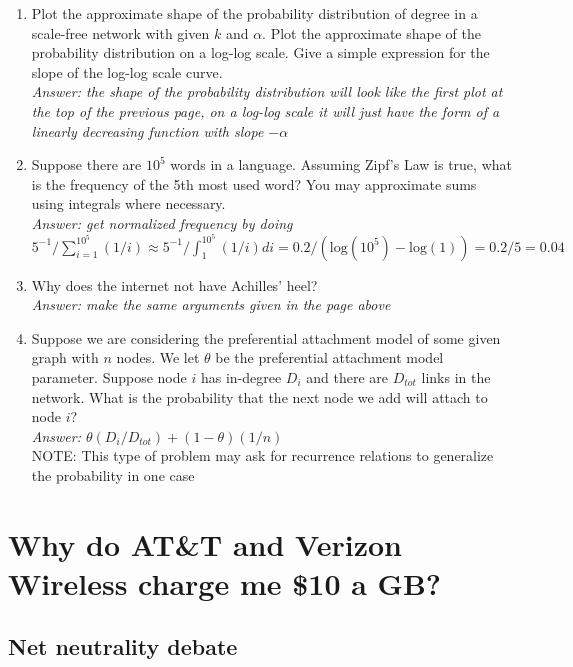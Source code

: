 \documentclass{article}
\begin{document}
\begin{enumerate}
\item Plot the approximate shape of the probability distribution of degree in a scale-free network with given $k$ and $\alpha$. Plot the approximate shape of the probability distribution on a log-log scale. Give a simple expression for the slope of the log-log scale curve. \\
\textit{Answer: the shape of the probability distribution will look like the first plot at the top of the previous page, on a log-log scale it will just have the form of a linearly decreasing function with slope $-\alpha$}
\item Suppose there are $10^5$ words in a language. Assuming Zipf's Law is true, what is the frequency of the 5th most used word? You may approximate sums using integrals where necessary. \\
\textit{Answer: get normalized frequency by doing $5^{-1}/\sum_{i=1}^{10^5} (1/i) \approx 5^{-1}/\int_{1}^{10^5} (1/i) di = 0.2/(\text{log}(10^5) - \text{log}(1)) = 0.2/5 = 0.04 $}
\item Why does the internet not have Achilles' heel? \\
\textit{Answer: make the same arguments given in the page above}
\item Suppose we are considering the preferential attachment model of some given graph with $n$ nodes. We let $\theta$ be the preferential attachment model parameter. Suppose node $i$ has in-degree $D_i$ and there are $D_{tot}$ links in the network. What is the probability that the next node we add will attach to node $i$? \\
\textit{Answer: $\theta(D_i/D_{tot}) + (1-\theta)(1/n)$} \\
NOTE: This type of problem may ask for recurrence relations to generalize the probability in one case
\end{enumerate}

\section{Why do AT\&T and Verizon Wireless charge me \$10 a GB?}

\subsection{Net neutrality debate}
\end{document}
